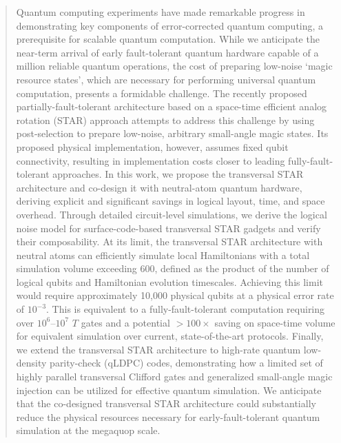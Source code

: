 \documentclass[aps, prx, reprint, superscriptaddress, longbibliography, floatfix]{revtex4-2}
\begin{document}
\begin{abstract}


Quantum computing experiments have made remarkable progress in demonstrating key components of error-corrected quantum computing, a prerequisite for scalable quantum computation. While we anticipate the near-term arrival of early fault-tolerant quantum hardware capable of a million reliable quantum operations, the cost of preparing low-noise `magic resource states', which are necessary for performing universal quantum computation, presents a formidable challenge. The recently proposed partially-fault-tolerant architecture based on a space-time efficient analog rotation (STAR) approach attempts to address this challenge by using post-selection to prepare low-noise, arbitrary small-angle magic states. Its proposed physical implementation, however, assumes fixed qubit connectivity, resulting in implementation costs closer to leading fully-fault-tolerant approaches. In this work, we propose the transversal STAR architecture and co-design it with neutral-atom quantum hardware, deriving explicit and significant savings in logical layout, time, and space overhead. Through detailed circuit-level simulations, we derive the logical noise model for surface-code-based transversal STAR gadgets and verify their composability. At its limit, the transversal STAR architecture with neutral atoms can efficiently simulate local Hamiltonians with a total simulation volume exceeding 600, defined as the product of the number of logical qubits and Hamiltonian evolution timescales. Achieving this limit would require approximately 10,000 physical qubits at a physical error rate of $10^{-3}$. This is equivalent to a fully-fault-tolerant computation requiring over $10^6$--$10^7$ $T$ gates and a potential $>100\times$ saving on space-time volume for equivalent simulation over current, state-of-the-art protocols. Finally, we extend the transversal STAR architecture to high-rate quantum low-density parity-check (qLDPC) codes, demonstrating how a limited set of highly parallel transversal Clifford gates and generalized small-angle magic injection can be utilized for effective quantum simulation. We anticipate that the co-designed transversal STAR architecture could substantially reduce the physical resources necessary for early-fault-tolerant quantum simulation at the megaquop scale.
\end{abstract}

\maketitle
\end{document}
